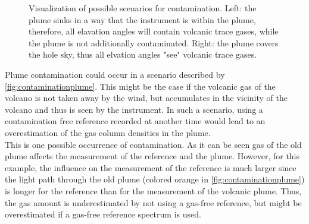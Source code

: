 \begin{figure}[h!]
	\centering
	\caption[Visualization of possible scenarios for contamination]{Visualization of possible scenarios for contamination. Left: the plume sinks in a way that the instrument is within the plume, therefore, all elavation angles will contain volcanic trace gases, while the plume is not additionally contaminated. Right: the plume covers the hole sky, thus all elvation angles "see" volcanic trace gases. }
	\label{fig:contaminationplumewideplume}
\end{figure}
%
Plume contamination could occur in a scenario described by  \cref{fig:contaminationplume}.
This might be the case if the volcanic gas of the volcano is not taken away by the wind, but accumulates in the vicinity of the volcano and thus is seen by the instrument. In such a scenario, using a contamination free reference recorded at another time would lead to an overestimation of the gas column densities in the plume.\\
This is one possible occurrence of contamination. As it can be seen gas of the old plume affects the measurement of the reference and the plume. However, for this example, the influence on the measurement of the reference is much larger since the light path through the old plume (colored orange in \cref{fig:contaminationplume}) is longer for the reference than for the measurement of the volcanic plume. Thus, the gas amount is underestimated by not using a gas-free reference, but might be overestimated if a gas-free reference spectrum is used.
